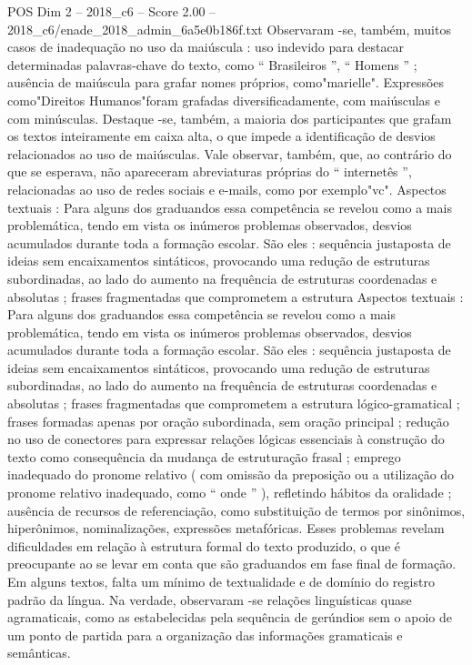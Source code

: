 \begin{textsample}{POS Dim 2 – 2018\_c6 – Score 2.00 – 2018\_c6/enade\_2018\_admin\_6a5e0b186f.txt}
Observaram -se, também, muitos casos de inadequação no uso da maiúscula : uso indevido para destacar determinadas palavras-chave do texto, como “ Brasileiros ”, “ Homens ” ; ausência de maiúscula para grafar nomes próprios, como"marielle".
Expressões como"Direitos Humanos"foram grafadas diversificadamente, com maiúsculas e com minúsculas.
Destaque -se, também, a maioria dos participantes que grafam os textos inteiramente em caixa alta, o que impede a identificação de desvios relacionados ao uso de maiúsculas.
Vale observar, também, que, ao contrário do que se esperava, não apareceram abreviaturas próprias do “ internetês ”, relacionadas ao uso de redes sociais e e-mails, como por exemplo"vc".
Aspectos textuais : Para alguns dos graduandos essa competência se revelou como a mais problemática, tendo em vista os inúmeros problemas observados, desvios acumulados durante toda a formação escolar.
São eles : sequência justaposta de ideias sem encaixamentos sintáticos, provocando uma redução de estruturas subordinadas, ao lado do aumento na frequência de estruturas coordenadas e absolutas ; frases fragmentadas que comprometem a estrutura Aspectos textuais : Para alguns dos graduandos essa competência se revelou como a mais problemática, tendo em vista os inúmeros problemas observados, desvios acumulados durante toda a formação escolar.
São eles : sequência justaposta de ideias sem encaixamentos sintáticos, provocando uma redução de estruturas subordinadas, ao lado do aumento na frequência de estruturas coordenadas e absolutas ; frases fragmentadas que comprometem a estrutura lógico-gramatical ; frases formadas apenas por oração subordinada, sem oração principal ; redução no uso de conectores para expressar relações lógicas essenciais à construção do texto como consequência da mudança de estruturação frasal ; emprego inadequado do pronome relativo ( com omissão da preposição ou a utilização do pronome relativo inadequado, como “ onde ” ), refletindo hábitos da oralidade ; ausência de recursos de referenciação, como substituição de termos por sinônimos, hiperônimos, nominalizações, expressões metafóricas.
Esses problemas revelam dificuldades em relação à estrutura formal do texto produzido, o que é preocupante ao se levar em conta que são graduandos em fase final de formação.
Em alguns textos, falta um mínimo de textualidade e de domínio do registro padrão da língua.
Na verdade, observaram -se relações linguísticas quase agramaticais, como as estabelecidas pela sequência de gerúndios sem o apoio de um ponto de partida para a organização das informações gramaticais e semânticas.

\end{textsample}
